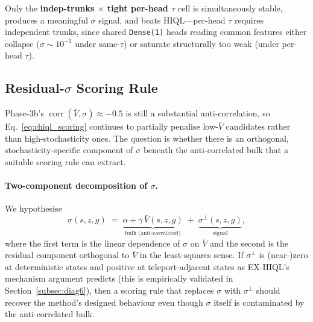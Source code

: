 \documentclass[11pt]{article}
\begin{document}
Only the \textbf{indep-trunks $\times$ tight per-head $\tau$} cell is
simultaneously stable, produces a meaningful $\sigma$ signal, and beats
HIQL---per-head $\tau$ requires independent trunks, since shared
\texttt{Dense(1)} heads reading common features either collapse
($\sigma\!\sim\!10^{-3}$ under same-$\tau$) or saturate structurally too
weak (under per-head $\tau$).

\subsection{Residual-$\sigma$ Scoring Rule}
\label{subsec:residual_sigma}

Phase-3b's $\operatorname{corr}(\bar V,\sigma) \approx -0.5$ is still a
substantial anti-correlation, so Eq.~\eqref{eq:chiql_scoring} continues to
partially penalise low-$\bar V$ candidates rather than high-stochasticity
ones.
The question is whether there is an orthogonal, stochasticity-specific
component of $\sigma$ beneath the anti-correlated bulk that a suitable
scoring rule can extract.

\paragraph{Two-component decomposition of $\sigma$.}
We hypothesise
\begin{equation}
  \sigma(s, z, g) \;=\; \underbrace{\alpha + \gamma\,\bar V(s, z, g)}_{\text{bulk (anti-correlated)}}
                        \;+\; \underbrace{\sigma^\perp(s, z, g)}_{\text{signal}},
  \label{eq:sigma_decomp}
\end{equation}
where the first term is the linear dependence of $\sigma$ on $\bar V$ and the
second is the residual component orthogonal to $\bar V$ in the least-squares
sense.
If $\sigma^\perp$ is (near-)zero at deterministic states and positive at
teleport-adjacent states as EX-HIQL's mechanism argument predicts (this
is empirically validated in Section~\ref{subsec:diag6}), then a
scoring rule that replaces $\sigma$ with $\sigma^\perp$ should recover the
method's designed behaviour even though $\sigma$ itself is contaminated by the
anti-correlated bulk.
\end{document}

